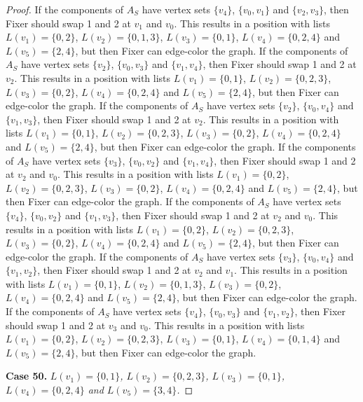 \documentclass[12pt]{amsart}
\theoremstyle{plain}
\theoremstyle{definition}
\theoremstyle{remark}
\begin{document}
\begin{proof}
If the components of $A_S$ have vertex sets $\{v_4\}$, $\{v_0, v_1\}$ and $\{v_2, v_3\}$, then Fixer should swap 1 and 2 at $v_1$ and $v_0$. This results in a position with lists $L(v_1) = \{0, 2\}$, $L(v_2) = \{0, 1, 3\}$, $L(v_3) = \{0, 1\}$, $L(v_4) = \{0, 2, 4\}$ and $L(v_5) = \{2, 4\}$, but then Fixer can edge-color the graph.
If the components of $A_S$ have vertex sets $\{v_2\}$, $\{v_0, v_3\}$ and $\{v_1, v_4\}$, then Fixer should swap 1 and 2 at $v_2$. This results in a position with lists $L(v_1) = \{0, 1\}$, $L(v_2) = \{0, 2, 3\}$, $L(v_3) = \{0, 2\}$, $L(v_4) = \{0, 2, 4\}$ and $L(v_5) = \{2, 4\}$, but then Fixer can edge-color the graph.
If the components of $A_S$ have vertex sets $\{v_2\}$, $\{v_0, v_4\}$ and $\{v_1, v_3\}$, then Fixer should swap 1 and 2 at $v_2$. This results in a position with lists $L(v_1) = \{0, 1\}$, $L(v_2) = \{0, 2, 3\}$, $L(v_3) = \{0, 2\}$, $L(v_4) = \{0, 2, 4\}$ and $L(v_5) = \{2, 4\}$, but then Fixer can edge-color the graph.
If the components of $A_S$ have vertex sets $\{v_3\}$, $\{v_0, v_2\}$ and $\{v_1, v_4\}$, then Fixer should swap 1 and 2 at $v_2$ and $v_0$. This results in a position with lists $L(v_1) = \{0, 2\}$, $L(v_2) = \{0, 2, 3\}$, $L(v_3) = \{0, 2\}$, $L(v_4) = \{0, 2, 4\}$ and $L(v_5) = \{2, 4\}$, but then Fixer can edge-color the graph.
If the components of $A_S$ have vertex sets $\{v_4\}$, $\{v_0, v_2\}$ and $\{v_1, v_3\}$, then Fixer should swap 1 and 2 at $v_2$ and $v_0$. This results in a position with lists $L(v_1) = \{0, 2\}$, $L(v_2) = \{0, 2, 3\}$, $L(v_3) = \{0, 2\}$, $L(v_4) = \{0, 2, 4\}$ and $L(v_5) = \{2, 4\}$, but then Fixer can edge-color the graph.
If the components of $A_S$ have vertex sets $\{v_3\}$, $\{v_0, v_4\}$ and $\{v_1, v_2\}$, then Fixer should swap 1 and 2 at $v_2$ and $v_1$. This results in a position with lists $L(v_1) = \{0, 1\}$, $L(v_2) = \{0, 1, 3\}$, $L(v_3) = \{0, 2\}$, $L(v_4) = \{0, 2, 4\}$ and $L(v_5) = \{2, 4\}$, but then Fixer can edge-color the graph.
If the components of $A_S$ have vertex sets $\{v_4\}$, $\{v_0, v_3\}$ and $\{v_1, v_2\}$, then Fixer should swap 1 and 2 at $v_3$ and $v_0$. This results in a position with lists $L(v_1) = \{0, 2\}$, $L(v_2) = \{0, 2, 3\}$, $L(v_3) = \{0, 1\}$, $L(v_4) = \{0, 1, 4\}$ and $L(v_5) = \{2, 4\}$, but then Fixer can edge-color the graph.

\noindent\textbf{Case 50.  }\textit{$L(v_1) = \{0, 1\}$, $L(v_2) = \{0, 2, 3\}$, $L(v_3) = \{0, 1\}$, $L(v_4) = \{0, 2, 4\}$ and $L(v_5) = \{3, 4\}$.}


\end{proof}
\end{document}
